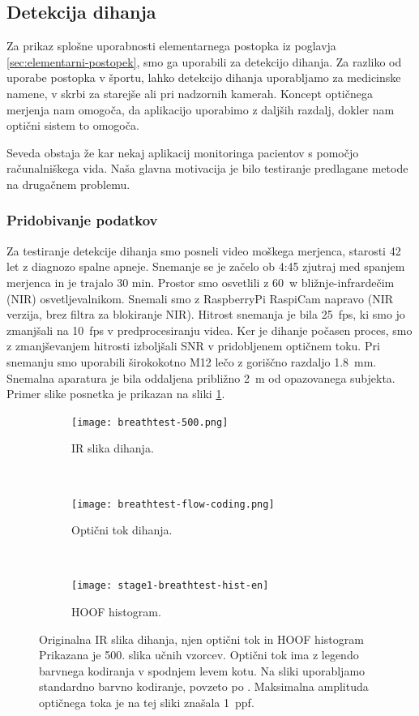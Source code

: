 \subsection{Detekcija dihanja}
Za prikaz splošne uporabnosti elementarnega postopka iz poglavja \ref{sec:elementarni-postopek}, smo ga uporabili za detekcijo dihanja. Za razliko od uporabe postopka v športu, lahko detekcijo dihanja uporabljamo za medicinske namene, v skrbi za starejše ali pri nadzornih kamerah. Koncept optičnega merjenja nam omogoča, da aplikacijo uporabimo z daljših razdalj, dokler nam optični sistem to omogoča. 

Seveda obstaja že kar nekaj aplikacij monitoringa pacientov s pomočjo računalniškega vida. Naša glavna motivacija je bilo testiranje predlagane metode na drugačnem problemu.

\subsubsection{Pridobivanje podatkov}
Za testiranje detekcije dihanja smo posneli video moškega merjenca, starosti 42 let z diagnozo spalne apneje. Snemanje se je začelo ob 4:45 zjutraj med spanjem merjenca in je trajalo 30 min. Prostor smo osvetlili z \SI{60}{w} bližnje-infrardečim (NIR) osvetljevalnikom. Snemali smo z RaspberryPi RaspiCam  napravo (NIR verzija, brez filtra za blokiranje NIR). Hitrost snemanja je bila \SI{25}{fps}, ki smo jo zmanjšali na \SI{10}{fps} v predprocesiranju videa. Ker je dihanje počasen proces, smo z zmanjševanjem hitrosti izboljšali SNR v pridobljenem optičnem toku. Pri snemanju smo uporabili širokokotno M12 lečo z goriščno razdaljo \SI{1.8}{mm}. Snemalna aparatura je bila oddaljena približno \SI{2}{m} od opazovanega subjekta. Primer slike posnetka je prikazan na sliki \ref{fig:dihanje-orig}.

\begin{figure}[htb]
	\centering
	\begin{subfigure}[t]{0.3\columnwidth}
		\centering
		\texttt{[image: breathtest-500.png]}
		\caption{IR slika dihanja.}
		\label{fig:dihanje-orig}
	\end{subfigure}
	~
	\begin{subfigure}[t]{0.3\columnwidth}
		\centering
		\texttt{[image: breathtest-flow-coding.png]}
		\caption{Optični tok dihanja.}
		\label{fig:dihanje-of}
	\end{subfigure}
	~
	\begin{subfigure}[t]{0.3\columnwidth}
		\centering
		\texttt{[image: stage1-breathtest-hist-en]}
		\caption{HOOF histogram.}
		\label{fig:dihanje-hist}
	\end{subfigure}
	\caption[Originalna IR slika dihanja, njen optični tok in HOOF histogram]{Originalna IR slika dihanja, njen optični tok in HOOF histogram Prikazana je 500. slika učnih vzorcev. Optični tok ima z legendo barvnega kodiranja v spodnjem levem kotu. Na sliki uporabljamo standardno barvno kodiranje, povzeto po \cite{baker2011database}. Maksimalna amplituda optičnega toka je na tej sliki znašala \SI{1}{ppf}.}
	\label{fig:dihanje}
\end{figure} 

